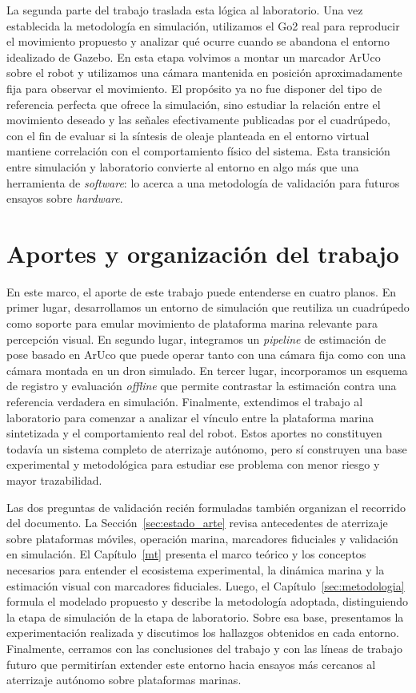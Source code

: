 \documentclass[12pt,a4paper]{report}
\begin{document}
La segunda parte del trabajo traslada esta lógica al laboratorio. Una vez
establecida la metodología en simulación, utilizamos el Go2 real para
reproducir el movimiento propuesto y analizar qué ocurre cuando se abandona el
entorno idealizado de Gazebo. En esta etapa volvimos a montar un marcador ArUco
sobre el robot y utilizamos una cámara mantenida en posición aproximadamente
fija para observar el movimiento. El propósito ya no fue disponer del tipo de
referencia perfecta que ofrece la simulación, sino estudiar la relación entre
el movimiento deseado y las señales efectivamente publicadas por el cuadrúpedo,
con el fin de evaluar si la síntesis de oleaje planteada en el entorno virtual
mantiene correlación con el comportamiento físico del sistema. Esta transición
entre simulación y laboratorio convierte al entorno en algo más que una
herramienta de \textit{software}: lo acerca a una metodología de validación para futuros
ensayos sobre \textit{hardware}.

\section{Aportes y organización del trabajo}

En este marco, el aporte de este trabajo puede entenderse en cuatro planos. En
primer lugar, desarrollamos un entorno de simulación que reutiliza un
cuadrúpedo como soporte para emular movimiento de plataforma marina relevante
para percepción visual. En segundo lugar, integramos un \textit{pipeline} de estimación de pose basado
en ArUco que puede operar tanto con una cámara fija como con una cámara montada
en un dron simulado. En tercer lugar, incorporamos un esquema de registro y
evaluación \textit{offline} que permite contrastar la estimación contra una
referencia verdadera en simulación. Finalmente, extendimos el trabajo al laboratorio para comenzar a
analizar el vínculo entre la plataforma marina sintetizada y el comportamiento
real del robot. Estos aportes no constituyen todavía un sistema completo de
aterrizaje autónomo, pero sí construyen una base experimental y metodológica
para estudiar ese problema con menor riesgo y mayor trazabilidad.

Las dos preguntas de validación recién formuladas también organizan el recorrido
del documento. La Sección~\ref{sec:estado_arte} revisa antecedentes de
aterrizaje sobre plataformas móviles, operación marina, marcadores fiduciales y
validación en simulación. El Capítulo~\ref{mt} presenta el marco teórico y los
conceptos necesarios para entender el ecosistema experimental, la dinámica
marina y la estimación visual con marcadores fiduciales. Luego, el
Capítulo~\ref{sec:metodologia} formula el modelado propuesto y describe la
metodología adoptada, distinguiendo la etapa de simulación de la etapa de
laboratorio. Sobre esa base, presentamos la experimentación realizada y
discutimos los hallazgos obtenidos en cada entorno. Finalmente, cerramos con las
conclusiones del trabajo y con las líneas de trabajo futuro que permitirían
extender este entorno hacia ensayos más cercanos al aterrizaje autónomo sobre
plataformas marinas.
\end{document}
